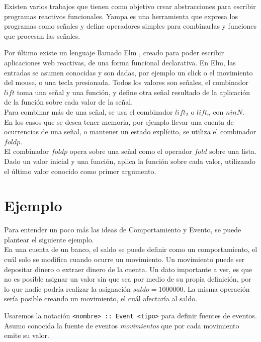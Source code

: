   Existen varios trabajos que tienen como objetivo crear abstracciones para escribir
programas reactivos funcionales.
  Yampa \cite{yampa} es una herramienta que expresa los programas como señales y
define operadores simples para combinarlas y funciones que procesan las señales.

  Por último existe un lenguaje llamado Elm \cite{evanczaplicki2012:Elm}, creado para
poder escribir aplicaciones web reactivas, de una forma funcional declarativa.
  En Elm, las entradas se asumen conocidas y son dadas, por ejemplo un click o el movimiento del mouse,
o una tecla presionada.
  Todos los valores son señales, el combinador $lift$
toma una señal y una función, y define otra señal resultado de la aplicación de la función
sobre cada valor de la señal.\\
  Para combinar más de una señal, se usa el combinador $lift_2$ o $lift_n$ con $n in N$.\\
  En los casos que se desea tener memoria, por ejemplo llevar una cuenta de ocurrencias
  de una señal, o mantener un estado explícito, se utiliza el combinador $foldp$.\\
  
  El combinador $foldp$ opera sobre una señal como el operador $fold$ sobre una lista. Dado
un valor inicial y una función, aplica la función sobre cada valor, utilizando el último
valor conocido como primer argumento.


\section{Ejemplo}

Para entender un poco más las ideas de Comportamiento y Evento, se puede
plantear el siguiente ejemplo.\\

  En una cuenta de un banco, el saldo se puede definir
como un comportamiento, el cuál solo se modifica cuando ocurre
un movimiento.
  Un movimiento puede ser depositar dinero o extraer
dinero de la cuenta.
  Un dato importante a ver, es que no es posible asignar un valor
sin que sea por medio de su propia definición, por lo que nadie
podría realizar la asignación $saldo = 1000000$.
  La misma operación sería posible creando un movimiento, el cuál
afectaría al saldo.

  Usaremos la notación \texttt{<nombre> :: Event <tipo>} para definir
fuentes de eventos.
  Asumo conocida la fuente de eventos \emph{movimientos} que por
cada movimiento emite su valor.

